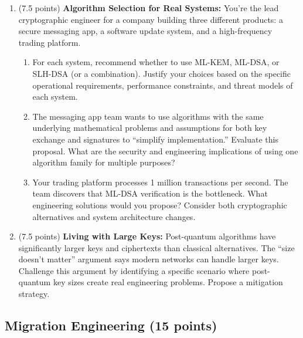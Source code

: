 \documentclass[10pt,a4paper,american]{article}
\begin{document}
\begin{enumerate}
	\item (7.5 points) \textbf{Algorithm Selection for Real Systems:}
	      You're the lead cryptographic engineer for a company building three different products: a secure messaging app, a software update system, and a high-frequency trading platform.
	      \begin{enumerate}
		      \item For each system, recommend whether to use ML-KEM, ML-DSA, or SLH-DSA (or a combination). Justify your choices based on the specific operational requirements, performance constraints, and threat models of each system.
		      \item The messaging app team wants to use algorithms with the same underlying mathematical problems and assumptions for both key exchange and signatures to ``simplify implementation.'' Evaluate this proposal. What are the security and engineering implications of using one algorithm family for multiple purposes?
		      \item Your trading platform processes 1 million transactions per second. The team discovers that ML-DSA verification is the bottleneck. What engineering solutions would you propose? Consider both cryptographic alternatives and system architecture changes.
	      \end{enumerate}
	\item (7.5 points) \textbf{Living with Large Keys:}
	      Post-quantum algorithms have significantly larger keys and ciphertexts than classical alternatives. The ``size doesn't matter'' argument says modern networks can handle larger keys. Challenge this argument by identifying a specific scenario where post-quantum key sizes create real engineering problems. Propose a mitigation strategy.
\end{enumerate}

\subsection{Migration Engineering (15 points)}
\end{document}
